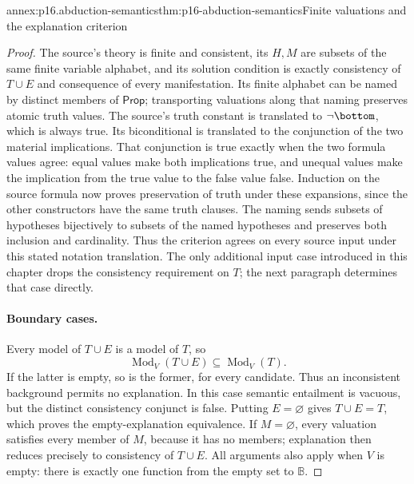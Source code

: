 \begin{annexitem}{annex:p16.abduction-semantics}{thm:p16-abduction-semantics}{Finite valuations and the explanation criterion}
\begin{proof}
The source's theory is finite and consistent, its \(H,M\) are subsets
of the same finite variable alphabet, and its solution condition is exactly
consistency of \(T\cup E\) and consequence of every manifestation.
Its finite alphabet can be named by distinct members of \(\mathsf{Prop}\);
transporting valuations along that naming preserves atomic truth values.
The source's truth constant is translated to \(\neg\bottom\), which
is always true. Its biconditional is translated to the conjunction of the
two material implications. That conjunction is true exactly when the two
formula values agree: equal values make both implications true, and unequal
values make the implication from the true value to the false value false.
Induction on the source formula now proves preservation of truth under
these expansions, since the other constructors have the same truth clauses.
The naming sends subsets of hypotheses bijectively to subsets of the named
hypotheses and preserves both inclusion and cardinality. Thus the criterion
agrees on every source input under this stated notation translation.
The only additional input
case introduced in this chapter drops the consistency requirement on \(T\);
the next paragraph determines that case directly.

\paragraph{Boundary cases.}
Every model of \(T\cup E\) is a model of \(T\), so
\[
 \operatorname{Mod}_V(T\cup E)\subseteq\operatorname{Mod}_V(T).
\]
If the latter is empty, so is the former, for every candidate. Thus an
inconsistent background permits no explanation. In this case semantic
entailment is vacuous, but the distinct consistency conjunct is false.
Putting \(E=\varnothing\) gives \(T\cup E=T\), which proves the
empty-explanation equivalence. If \(M=\varnothing\), every valuation
satisfies every member of \(M\), because it has no members; explanation
then reduces precisely to consistency of \(T\cup E\). All arguments
also apply when \(V\) is empty: there is exactly one function from the
empty set to \(\mathbb{B}\).
\end{proof}
\end{annexitem}

